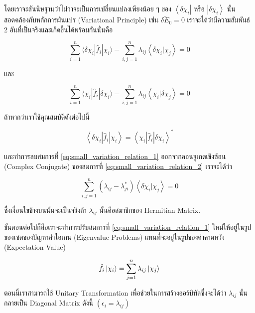 \noindent โดยเราจะสันนิษฐานว่าไม่ว่าจะเป็นการเปลี่ยนแปลงเพียงน้อย ๆ ของ $\left\langle\delta \chi_i\right|$ หรือ
$\left|\delta \chi_i\right\rangle$ นั้นสอดคล้องกับหลักการผันแปร (Variational Principle) เช่น $\delta \tilde{E}_0=0$
เราจะได้ว่ามีความสัมพันธ์ 2 อันที่เป็นจริงและเกิดขึ้นได้พร้อมกันนั่นคือ

\begin{equation}
    \label{eq:small_variation_relation_1}
    \sum_{i=1}^n \langle\delta \chi_i | \hat{f}_i | \chi_i \rangle
    - \sum_{i, j=1}^n \lambda_{i j}\left\langle\delta \chi_i | \chi_j\right\rangle
    = 0
\end{equation}

\noindent และ

\begin{equation}
    \label{eq:small_variation_relation_2}
    \sum_{i=1}^n \langle\chi_i | \hat{f}_i | \delta \chi_i \rangle
    - \sum_{i, j=1}^n \lambda_{i j}\left\langle\chi_i | \delta \chi_j\right\rangle
    = 0
\end{equation}

ถ้าหากว่าเราใช้คุณสมบัติดังต่อไปนี้

\begin{equation}
    \left\langle\delta \chi_i\left|\hat{f}_i\right| \chi_i\right\rangle
    =
    \left\langle\chi_i\left|\hat{f}_i\right| \delta \chi_i\right\rangle^*
\end{equation}

\noindent และทำการลบสมการที่ \eqref{eq:small_variation_relation_1} ออกจากคอนจูเกตเชิงซ้อน (Complex Conjugate) ของสมการที่
\eqref{eq:small_variation_relation_2} เราจะได้ว่า

\begin{equation}
    \sum_{i, j=1}^n
    \left(\lambda_{i j}-\lambda_{j i}^*\right)
    \left\langle\delta \chi_i | \chi_j\right\rangle
    = 0
\end{equation}

\noindent ซึ่งเงื่อนไขข้างบนนั้นจะเป็นจริงถ้า $\lambda_{i j}$ นั้นคือสมาชิกของ Hermitian Matrix.

ขั้นตอนต่อไปก็คือเราจะทำการปรับสมการที่ \eqref{eq:small_variation_relation_1} ใหม่ให้อยู่ในรูปของเซตของปัญหาค่าไอเกน
(Eigenvalue Problems) แทนที่จะอยู่ในรูปของค่าคาดหวัง (Expectation Value)

\begin{equation}
    \hat{f}_i \ket{\chi_i}
    =
    \sum_{j=1}^{n} \lambda_{i j} \ket{\chi_j}
\end{equation}

ตอนนี้เราสามารถใช้ Unitary Transformation เพื่อช่วยในการสร้างออร์บิทัลซึ่งจะได้ว่า $\lambda_{i j}$ นั้นกลายเป็น Diagonal Matrix
ดังนี้ $(\epsilon_{i} = \lambda_{i j})$

